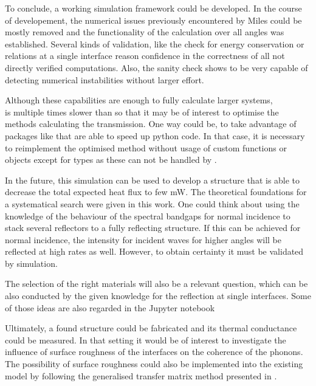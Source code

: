 To conclude, a working simulation framework could be developed. In the course
of developement, the numerical issues previously encountered by Miles could be
mostly removed and the functionality of the calculation over all angles was
established. Several kinds
of validation, like the check for energy conservation or relations at a single
interface reason confidence in the correctness of all not directly verified
computations. Also, the sanity check shows to be very capable of detecting
numerical instabilities without larger effort.

Although these capabilities are enough to fully calculate larger systems,\\
 is multiple times slower than 
so that it may be of interest to optimise the methods calculating the
transmission. One way could be, to take advantage of packages like 
that are able to speed up python code. In that case, it is necessary to
reimplement the optimised method without usage of custom functions or objects
except for  types as these can not be handled by .

In the future, this simulation can be used to develop a structure that is able
to decrease the total expected heat flux to few mW. The theoretical foundations
for a systematical search were given in this work. One could think about using
the knowledge of the behaviour of the spectral bandgaps for normal incidence
to stack several reflectors to a fully reflecting structure. If this can be
achieved for normal incidence, the intensity for incident waves for higher
angles will be reflected at high rates as well. However, to obtain certainty it
must be validated by simulation.

The selection of the right materials will also be a relevant question, which
can be also conducted by the given knowledge for the reflection at single
interfaces. Some of those ideas are also regarded in the Jupyter notebook

Ultimately, a found structure could be fabricated and its thermal conductance
could be measured. In that setting it would be of interest to investigate the
influence of surface roughness of the interfaces on the coherence of the
phonons. The possibility of surface roughness could also be implemented into
the existing model by following the generalised transfer matrix method
presented in \cite{Katsidis2002}.